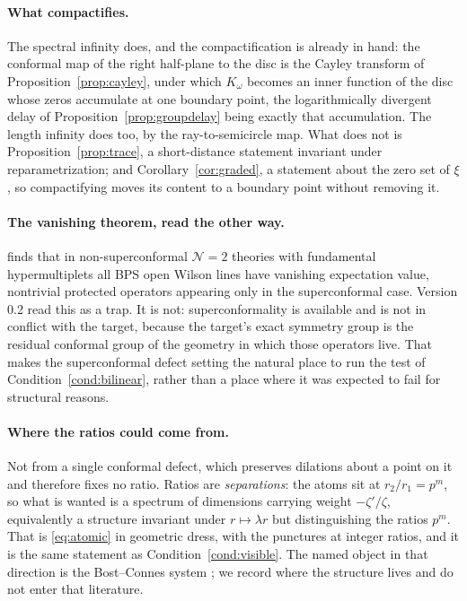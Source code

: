 \paragraph{What compactifies.} The spectral infinity does, and the
compactification is already in hand: the conformal map of the right half-plane to
the disc is the Cayley transform of Proposition~\ref{prop:cayley}, under which
$K_\omega$ becomes an inner function of the disc whose zeros accumulate at one
boundary point, the logarithmically divergent delay of
Proposition~\ref{prop:groupdelay} being exactly that accumulation. The length
infinity does too, by the ray-to-semicircle map. What does not is
Proposition~\ref{prop:trace}, a short-distance statement invariant under
reparametrization; and Corollary~\ref{cor:graded}, a statement about the zero set
of $\xi$, so compactifying moves its content to a boundary point without removing
it.

\paragraph{The vanishing theorem, read the other way.}
\cite{OWL} finds that in non-superconformal $\mathcal N=2$ theories with
fundamental hypermultiplets all BPS open Wilson lines have vanishing expectation
value, nontrivial protected operators appearing only in the superconformal case.
Version 0.2 read this as a trap. It is not: superconformality is available and is
not in conflict with the target, because the target's exact symmetry group is the
residual conformal group of the geometry in which those operators live. That
makes the superconformal defect setting the natural place to run the test of
Condition~\ref{cond:bilinear}, rather than a place where it was expected to fail
for structural reasons.

\paragraph{Where the ratios could come from.} Not from a single conformal defect,
which preserves dilations about a point on it and therefore fixes no ratio.
Ratios are \emph{separations}: the atoms sit at $r_2/r_1=p^m$, so what is wanted
is a spectrum of dimensions carrying weight $-\zeta'/\zeta$, equivalently a
structure invariant under $r\mapsto\lambda r$ but distinguishing the ratios
$p^m$. That is \eqref{eq:atomic} in geometric dress, with the punctures at
integer ratios, and it is the same statement as Condition~\ref{cond:visible}. The
named object in that direction is the Bost--Connes system \cite{BostConnes}; we
record where the structure lives and do not enter that literature.
